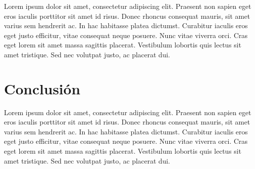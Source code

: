 \documentclass[12pt]{article}
\begin{document}
Lorem ipsum dolor sit amet, consectetur adipiscing elit. Praesent non sapien eget eros iaculis porttitor sit amet id risus. Donec rhoncus consequat mauris, sit amet varius sem hendrerit ac. In hac habitasse platea dictumst. Curabitur iaculis eros eget justo efficitur, vitae consequat neque posuere. Nunc vitae viverra orci. Cras eget lorem sit amet massa sagittis placerat. Vestibulum lobortis quis lectus sit amet tristique. Sed nec volutpat justo, ac placerat dui. 


\section{Conclusión}

Lorem ipsum dolor sit amet, consectetur adipiscing elit. Praesent non sapien eget eros iaculis porttitor sit amet id risus. Donec rhoncus consequat mauris, sit amet varius sem hendrerit ac. In hac habitasse platea dictumst. Curabitur iaculis eros eget justo efficitur, vitae consequat neque posuere. Nunc vitae viverra orci. Cras eget lorem sit amet massa sagittis placerat. Vestibulum lobortis quis lectus sit amet tristique. Sed nec volutpat justo, ac placerat dui. 
\end{document}
